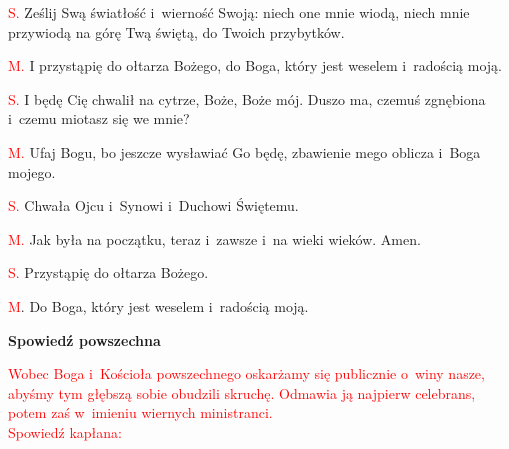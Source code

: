 \begin{Parallel}[v]{0.485\textwidth}{0.485\textwidth}
{\textcolor{red}{S.} \textcolor{my-color}{Ześlij Swą światłość i~wierność Swoją: niech one mnie wiodą, niech mnie przywiodą na górę Twą świętą, do Twoich przybytków.}

\textcolor{red}{M.} \textcolor{my-color}{I przystąpię do ołtarza Bożego, do Boga, który jest weselem i~radością moją.}

\textcolor{red}{S.} \textcolor{my-color}{I będę Cię chwalił na cytrze, Boże, Boże mój. Duszo ma, czemuś zgnębiona i~czemu miotasz się we mnie?}

\textcolor{red}{M.} \textcolor{my-color}{Ufaj Bogu, bo jeszcze wysławiać Go będę, zbawienie mego oblicza i~Boga mojego.}

\textcolor{red}{S.} \textcolor{my-color}{Chwała Ojcu i~Synowi i~Duchowi Świętemu.}

\textcolor{red}{M.} \textcolor{my-color}{Jak była na początku, teraz i~zawsze i~na wieki wieków. Amen.}

\textcolor{red}{S.} \textcolor{my-color}{Przystąpię do ołtarza Bożego.}

\textcolor{red}{M}. \textcolor{my-color}{Do Boga, który jest weselem i~radością moją.}
}
\end{Parallel}

\begin{center}
\textbf{Spowiedź powszechna}
\end{center}

\begin{center}
\textcolor{red}{Wobec Boga i~Kościoła powszechnego oskarżamy się publicznie o~winy nasze, abyśmy tym głębszą sobie obudzili skruchę. Odmawia ją najpierw celebrans, potem zaś w~imieniu wiernych ministranci.\\
Spowiedź kapłana:}
\end{center}


